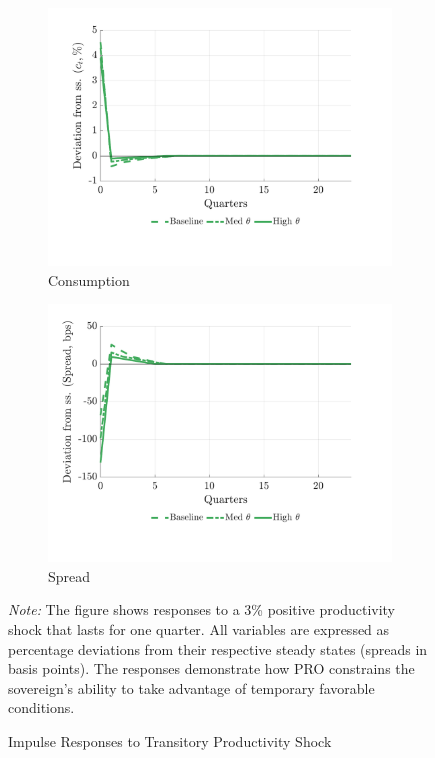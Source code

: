\documentclass[12pt]{article}
\theoremstyle{plain}
\begin{document}
\begin{figure}[h]
\begin{subfigure}[b]{0.48\textwidth}
		\centering
		\includegraphics[width=\textwidth]{../../pro-default-model/results/comparison_figure_15.pdf}
		\caption{Consumption}
		\label{fig:irf_trans_consumption}
	\end{subfigure}
	\hfill
	\begin{subfigure}[b]{0.48\textwidth}
		\centering
		\includegraphics[width=\textwidth]{../../pro-default-model/results/comparison_figure_16.pdf}
		\caption{Spread}
		\label{fig:irf_trans_spread}
	\end{subfigure}
	\caption{Impulse Responses to Transitory Productivity Shock}
	\label{fig:irf_transitory}
	\parbox{\linewidth}{\small\textit{Note:} The figure shows responses to a 3\% positive productivity shock that lasts for one quarter. All variables are expressed as percentage deviations from their respective steady states (spreads in basis points). The responses demonstrate how PRO constrains the sovereign's ability to take advantage of temporary favorable conditions.}
\end{figure}
\end{document}
